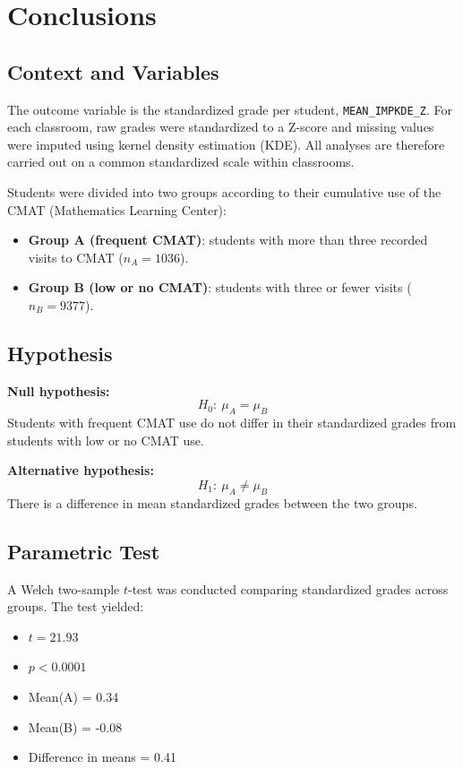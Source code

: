 \documentclass[8pt,a4paper]{article} %
\numberwithin{figure}{subsection}
\begin{document}
\newpage
\section{Conclusions}


\subsection{Context and Variables}

The outcome variable is the standardized grade per student,
\texttt{MEAN\_IMPKDE\_Z}. For each classroom, raw grades were
standardized to a Z-score and missing values were imputed using
kernel density estimation (KDE). All analyses are therefore carried
out on a common standardized scale within classrooms.

Students were divided into two groups according to their cumulative
use of the CMAT (Mathematics Learning Center):
\begin{itemize}
  \item \textbf{Group A (frequent CMAT)}: students with more than three
        recorded visits to CMAT ($n_A = 1036$).
  \item \textbf{Group B (low or no CMAT)}: students with three or fewer
        visits ($n_B = 9377$).
\end{itemize}

\subsection{Hypothesis}

\textbf{Null hypothesis:}
\[
H_0:\ \mu_A = \mu_B
\]
Students with frequent CMAT use do not differ in their standardized
grades from students with low or no CMAT use.

\textbf{Alternative hypothesis:}
\[
H_1:\ \mu_A \neq \mu_B
\]
There is a difference in mean standardized grades between the two
groups.

\subsection{Parametric Test}

A Welch two-sample $t$-test was conducted comparing standardized
grades across groups. The test yielded:

\begin{itemize}
  \item $t = 21.93$
  \item $p < 0.0001$
  \item Mean(A) = 0.34
  \item Mean(B) = -0.08
  \item Difference in means = 0.41
\end{itemize}
\end{document}
